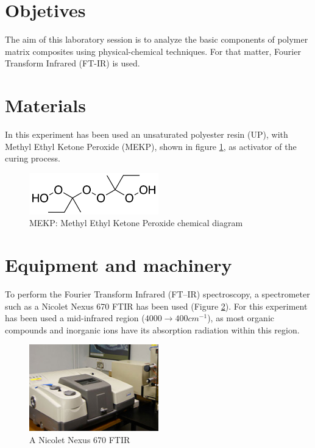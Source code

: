 \section{Objetives}

The aim of this laboratory session is to analyze the basic components of polymer
matrix composites using physical-chemical techniques. For that matter,
Fourier Transform Infrared (FT-IR) is used.\\

\section{Materials}
In this experiment has been used an unsaturated polyester resin (UP), with
Methyl Ethyl Ketone Peroxide (MEKP), shown in figure \ref{fig:mekp}, as activator
of the curing process.\\

\begin{figure}[h]
	\centering
	\includegraphics[width=0.5\textwidth]{img/MEKP.png}
	\caption{MEKP: Methyl Ethyl Ketone Peroxide chemical diagram}
	\label{fig:mekp}
\end{figure}

\section{Equipment and machinery}
To perform the Fourier Transform Infrared (FT--IR) spectroscopy, a spectrometer
such as a Nicolet Nexus 670 FTIR has been used (Figure \ref{fig:machinery}). For this experiment
has been used a mid-infrared region ($4000 \rightarrow 400 cm^{-1}$), as most organic compounds
and inorganic ions have its absorption radiation within this region.\\

\begin{figure}[h]
	\centering
	\includegraphics[width=0.5\textwidth]{img/machinery.jpg}
	\caption{A Nicolet Nexus 670 FTIR}
	\label{fig:machinery}
\end{figure}

